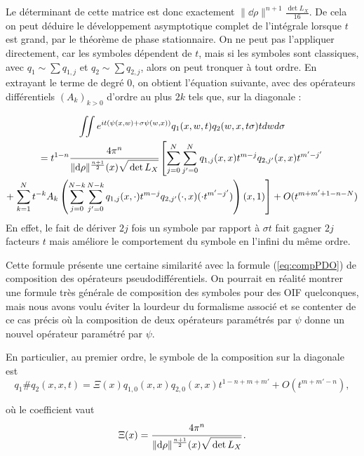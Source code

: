Le déterminant de cette matrice est donc exactement $\|\dd\rho\|^{n+1}\frac{\det L_X}{16}$. De cela on peut déduire le développement asymptotique complet de l'intégrale lorsque $t$ est grand, par le théorème de phase stationnaire. On ne peut pas l'appliquer directement, car les symboles dépendent de $t$, mais si les symboles sont classiques, avec $q_1 \sim \sum q_{1,j}$ et $q_2 \sim  \sum q_{2,j}$, alors on peut tronquer à tout ordre. En extrayant le terme de degré $0$, on obtient l'équation suivante, avec des opérateurs différentiels $(A_k)_{k >0}$ d'ordre au plus $2k$ tels que, sur la diagonale :

\begin{multline*}
  \iint e^{it(\psi(x,w)+\sigma \psi(w,x))}q_1(x,w,t)q_2(w,x,t\sigma)tdwd\sigma \\= t^{1-n}\cfrac{4\pi^n}{\|\dd\rho\|^{\frac{n+1}{2}}(x)\sqrt{\vphantom{\hat{A}}\det L_X}}\left[\sum_{j=0}^{N}\sum_{j'=0}^{N} q_{1,j}(x,x)t^{m-j}q_{2,j'}(x,x)t^{m'-j'}\right. \\+ \left.\sum_{k=1}^{N}t^{-k}A_k\left(\sum_{j=0}^{N-k}\sum_{j'=0}^{N-k} q_{1,j}(x,\cdot)t^{m-j}q_{2,j'}(\cdot,x)(\cdot t^{m'-j'})\right)(x,1)\right] + O(t^{m+m'+1-n-N})
\end{multline*}
En effet, le fait de dériver $2j$ fois un symbole par rapport à $\sigma t$ fait gagner $2j$ facteurs $t$ mais améliore le comportement du symbole en l'infini du même ordre.

\begin{rem}
Cette formule présente une certaine similarité avec la formule (\ref{eq:compPDO}) de composition des opérateurs pseudodifférentiels. On pourrait en réalité montrer une formule très générale de composition des symboles pour des OIF quelconques, mais nous avons voulu éviter la lourdeur du formalisme associé et se contenter de ce cas précis où la composition de deux opérateurs paramétrés par $\psi$ donne un nouvel opérateur paramétré par $\psi$.
\end{rem}

En particulier, au premier ordre, le symbole de la composition sur la diagonale est
\begin{equation*}
  q_1\#q_2(x,x,t) = \Xi(x)q_{1,0}(x,x)q_{2,0}(x,x)t^{1-n+m+m'} + O(t^{m+m'-n}),
\end{equation*}

où le coefficient vaut 
\begin{equation*}
	\Xi(x) = \cfrac{4\pi^n}{\|\dd\rho\|^{\frac{n+1}{2}}(x)\sqrt{\vphantom{\hat{A}}\det L_X}}\,.
\end{equation*}

